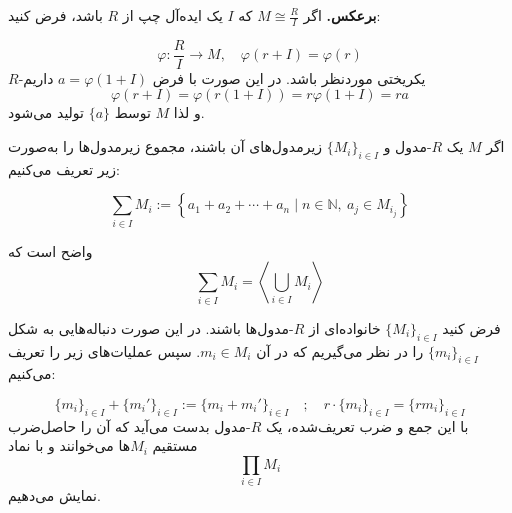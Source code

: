 \begin{frame}

    \textbf{برعکس.}
    اگر $M \cong \frac{R}{I}$ که $I$ یک ایده‌آل چپ از $R$ باشد، فرض کنید:

    \[
        \varphi : \frac{R}{I} \longrightarrow M, \quad \varphi(r + I) = \varphi(r)
    \]
    $R$-یکریختی
    موردنظر باشد.
    در این صورت با فرض $a = \varphi(1 + I)$ داریم
    \[
        \varphi(r + I) = \varphi(r(1 + I)) = r \varphi(1 + I) = ra
    \]
    و لذا $M$ توسط $\{a\}$ تولید می‌شود.

\end{frame}


\begin{frame}
    \begin{definition}
        اگر $M$ یک $R$-مدول و $\{M_i\}_{i \in I}$ زیرمدول‌های آن باشند، مجموع زیرمدول‌ها را به‌صورت زیر تعریف می‌کنیم:

        \[
            \sum_{i \in I} M_i := \left\{ a_1 + a_2 + \cdots + a_n \mid n \in \mathbb{N},\ a_j \in M_{i_j} \right\}
        \]



    \end{definition}

    \begin{lemma}
        واضح است که
        \[
            \sum_{i \in I} M_i = \left\langle \bigcup_{i \in I} M_i \right\rangle
        \]
    \end{lemma}

\end{frame}

\begin{frame}
    \begin{definition}
        فرض کنید $\{M_i\}_{i \in I}$ خانواده‌ای از $R$-مدول‌ها باشند.
        در این صورت دنباله‌هایی به شکل $\{m_i\}_{i \in I}$ را در نظر می‌گیریم که در آن $m_i \in M_i$. سپس عملیات‌های زیر را تعریف می‌کنیم:

        \[
            \{m_i\}_{i \in I} + \{m_i'\}_{i \in I} := \{m_i + m_i'\}_{i \in I}
            \quad ; \quad
            r \cdot \{m_i\}_{i \in I} = \{r m_i\}_{i \in I}
        \]
        با این جمع و ضرب تعریف‌شده، یک $R$-مدول بدست می‌آید که آن را حاصل‌ضرب مستقیم $M_i$ها می‌خوانند و با نماد
        \[
            \prod_{i \in I} M_i
        \]
        نمایش می‌دهیم.

    \end{definition}

\end{frame}



